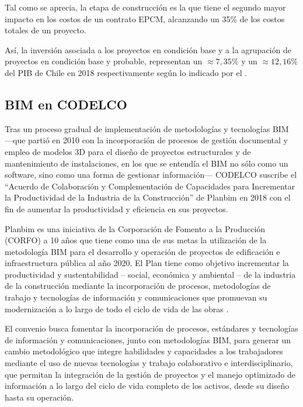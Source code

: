 Tal como se aprecia, la etapa de construcción es la que tiene el segundo mayor impacto en los costos de un contrato EPCM, alcanzando un 35\% de los costos totales de un proyecto.

Así, la inversión asociada a los proyectos en condición base y a la agrupación de proyectos en condición base y probable, representan un $\approx 7,35$\% y un $\approx 12,16$\% del PIB de Chile en 2018  respectivamente según lo indicado por el .


\subsection{BIM en CODELCO}


Tras un proceso gradual de implementación de metodologías y tecnologías BIM ---que partió en 2010 con la incorporación de procesos de gestión documental y empleo de modelos 3D para el diseño de proyectos estructurales y de mantenimiento de instalaciones, en los que se entendía el BIM no sólo como un software, sino como una forma de gestionar información--- CODELCO suscribe el ``Acuerdo de Colaboración y Complementación de Capacidades para Incrementar la Productividad de la Industria de la Construcción'' de Planbim en 2018 con el fin de aumentar la productividad y eficiencia en sus proyectos. 

Planbim es una iniciativa de la Corporación de Fomento a la Producción (CORFO) a 10 años que tiene como una de sus metas la utilización de la metodología BIM para el desarrollo y operación de proyectos de edificación e infraestructura pública al año 2020.  El Plan tiene como objetivo incrementar la productividad y sustentabilidad – social, económica y ambiental – de la industria de la construcción mediante la incorporación de procesos, metodologías de trabajo y tecnologías de información y comunicaciones que promuevan su modernización a lo largo de todo el ciclo de vida de las obras \cite{planbim}.

El convenio busca fomentar la incorporación de procesos, estándares y tecnologías de información y comunicaciones, junto con metodologías BIM, para generar un cambio metodológico que integre habilidades y capacidades a los trabajadores mediante el uso de nuevas tecnologías y trabajo colaborativo e interdisciplinario, que permitan la integración de la gestión de proyectos y el manejo optimizado de información a lo largo del ciclo de vida completo de los activos, desde su diseño hasta su operación.


